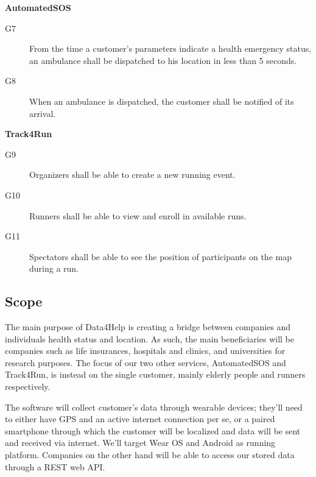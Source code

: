 \documentclass[../main.tex]{subfiles}
\begin{document}
\begin{minipage}{\textwidth}
{\bf AutomatedSOS}
\begin{description}
	\item [G7]  From the time a customer's parameters indicate a health emergency status, an ambulance shall be dispatched to his location in less than 5 seconds.
	\item [G8]  When an ambulance is dispatched, the customer shall be notified of its arrival.
\end{description}
\end{minipage}
\vspace{8mm}

\begin{minipage}{\textwidth}
{\bf Track4Run}
\begin{description}
	\item [G9]   Organizers shall be able to create a new running event.
	\item [G10]  Runners shall be able to view and enroll in available runs.
	\item [G11]  Spectators shall be able to see the position of participants on the map during a run.
\end{description}
\end{minipage}

\subsection{Scope}

The main purpose of Data4Help is creating a bridge between companies and individuals health status and location. As such, the main beneficiaries will be companies such as life insurances, hospitals and clinics, and universities for research purposes.
The focus of our two other services, AutomatedSOS and Track4Run, is instead on the single customer, mainly elderly people and runners respectively.

The software will collect customer's data through wearable devices; they'll need to either have GPS and an active internet connection per se, or a paired smartphone through which the customer will be localized and data will be sent and received via internet. We'll target Wear OS and Android as running platform. Companies on the other hand will be able to access our stored data through a REST web API.
\end{document}
